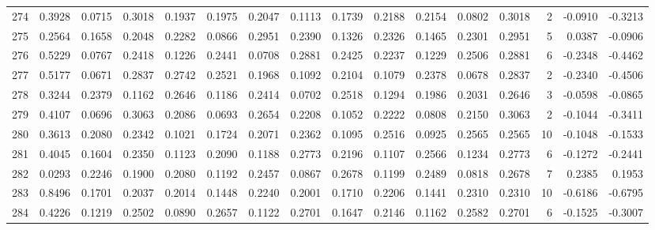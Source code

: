 \begin{tabular}{lrrrrrrrrrrrrrrr}
274 &      0.3928 &  0.0715 &  0.3018 &  0.1937 &  0.1975 &  0.2047 &  0.1113 &  0.1739 &  0.2188 &  0.2154 &   0.0802 &     0.3018 &      2 &                   -0.0910 &                    -0.3213 \\
275 &      0.2564 &  0.1658 &  0.2048 &  0.2282 &  0.0866 &  0.2951 &  0.2390 &  0.1326 &  0.2326 &  0.1465 &   0.2301 &     0.2951 &      5 &                    0.0387 &                    -0.0906 \\
276 &      0.5229 &  0.0767 &  0.2418 &  0.1226 &  0.2441 &  0.0708 &  0.2881 &  0.2425 &  0.2237 &  0.1229 &   0.2506 &     0.2881 &      6 &                   -0.2348 &                    -0.4462 \\
277 &      0.5177 &  0.0671 &  0.2837 &  0.2742 &  0.2521 &  0.1968 &  0.1092 &  0.2104 &  0.1079 &  0.2378 &   0.0678 &     0.2837 &      2 &                   -0.2340 &                    -0.4506 \\
278 &      0.3244 &  0.2379 &  0.1162 &  0.2646 &  0.1186 &  0.2414 &  0.0702 &  0.2518 &  0.1294 &  0.1986 &   0.2031 &     0.2646 &      3 &                   -0.0598 &                    -0.0865 \\
279 &      0.4107 &  0.0696 &  0.3063 &  0.2086 &  0.0693 &  0.2654 &  0.2208 &  0.1052 &  0.2222 &  0.0808 &   0.2150 &     0.3063 &      2 &                   -0.1044 &                    -0.3411 \\
280 &      0.3613 &  0.2080 &  0.2342 &  0.1021 &  0.1724 &  0.2071 &  0.2362 &  0.1095 &  0.2516 &  0.0925 &   0.2565 &     0.2565 &     10 &                   -0.1048 &                    -0.1533 \\
281 &      0.4045 &  0.1604 &  0.2350 &  0.1123 &  0.2090 &  0.1188 &  0.2773 &  0.2196 &  0.1107 &  0.2566 &   0.1234 &     0.2773 &      6 &                   -0.1272 &                    -0.2441 \\
282 &      0.0293 &  0.2246 &  0.1900 &  0.2080 &  0.1192 &  0.2457 &  0.0867 &  0.2678 &  0.1199 &  0.2489 &   0.0818 &     0.2678 &      7 &                    0.2385 &                     0.1953 \\
283 &      0.8496 &  0.1701 &  0.2037 &  0.2014 &  0.1448 &  0.2240 &  0.2001 &  0.1710 &  0.2206 &  0.1441 &   0.2310 &     0.2310 &     10 &                   -0.6186 &                    -0.6795 \\
284 &      0.4226 &  0.1219 &  0.2502 &  0.0890 &  0.2657 &  0.1122 &  0.2701 &  0.1647 &  0.2146 &  0.1162 &   0.2582 &     0.2701 &      6 &                   -0.1525 &                    -0.3007 \\

\end{tabular}
